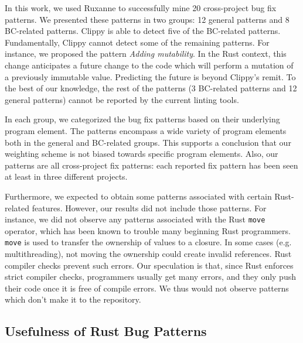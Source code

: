 In this work, we used Ruxanne to successfully mine 20 cross-project bug fix patterns. We presented these patterns in two groups: 12 general patterns and 8 BC-related patterns. Clippy is able to detect five of the BC-related patterns. Fundamentally, Clippy cannot detect some of the remaining patterns. For instance, we proposed the pattern \textit{Adding mutability}. In the Rust context, this change anticipates a future change to the code which will perform a mutation of a previously immutable value. Predicting the future is beyond Clippy's remit. To the best of our knowledge, the rest of the patterns (3 BC-related patterns and 12 general patterns) cannot be reported by the current linting tools. 

In each group, we categorized the bug fix patterns based on their underlying program element. The patterns encompass a wide variety of program elements both in the general and BC-related groups. This supports a conclusion that our weighting scheme is not biased towards specific program elements. Also, our patterns are all cross-project fix patterns: each reported fix pattern has been seen at least in three different projects.

Furthermore, we expected to obtain some patterns associated with certain Rust-related features. However, our results did not include those patterns. For instance, we did not observe any patterns associated with the Rust \verb+move+ operator, which has been known to trouble many beginning Rust programmers. \verb+move+ is used to transfer the ownership of values to a closure. In some cases (e.g. multithreading), not moving the ownership could create invalid references. Rust compiler checks prevent such errors. Our speculation is that, since Rust enforces strict compiler checks, programmers usually get many errors, and they only push their code once it is free of compile errors. We thus would not observe patterns which don't make it to the repository.

\subsection{Usefulness of Rust Bug Patterns}

